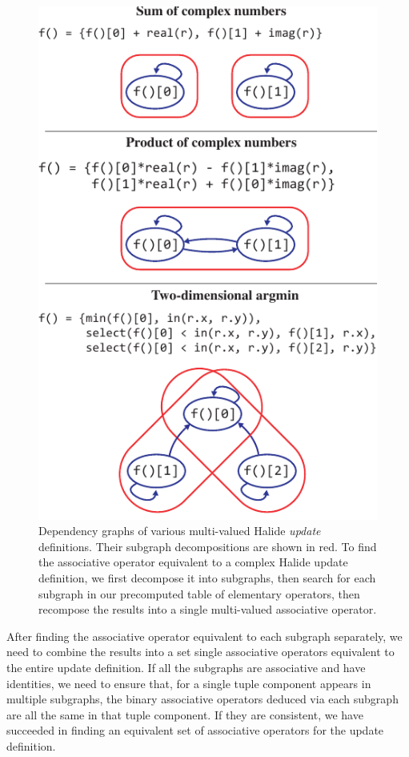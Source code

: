 \begin{figure}
\centering
\includegraphics{subgraphs}
\caption{Dependency graphs of various multi-valued Halide \emph{update} definitions. Their subgraph decompositions are shown in red. To find the associative operator equivalent to a complex Halide update definition, we first decompose it into subgraphs, then search for each subgraph in our precomputed table of elementary operators, then recompose the results into a single multi-valued associative operator.}
\label{fig:subgraphs}
\end{figure}

After finding the associative operator equivalent to each subgraph separately, we need to combine the results into a set single associative operators equivalent to the entire update definition. If all the subgraphs are associative and have identities, we need to ensure that, for a single tuple component appears in multiple subgraphs, the binary associative operators deduced via each subgraph are all the same in that tuple component. If they are consistent, we have succeeded in finding an equivalent set of associative operators for the update definition.

